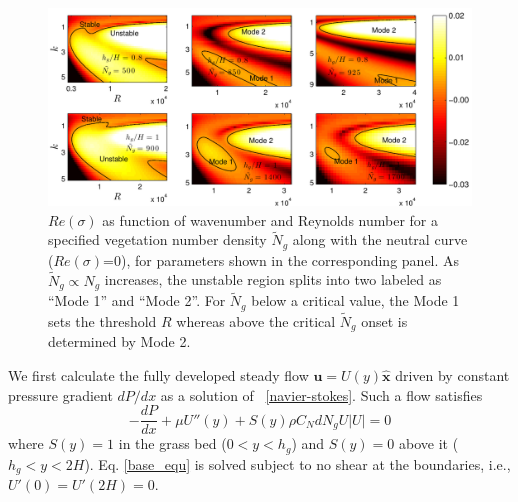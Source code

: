 \documentclass[aps,preprint,12pt]{revtex4-1}  %
\newcommand{\bu}{\mathbf{u}}
\newcommand{\hg}{h_g}
\newcommand{\Rey}{{R}}
\newcommand{\Ndg}{\tilde{N}_g}
\begin{document}
\begin{figure}
 \includegraphics[width=\textwidth]{SetAll_imgsc}

\caption{$Re(\sigma)$ as function of wavenumber and Reynolds number for a specified vegetation number density $\Ndg$ along with the neutral curve ($Re(\sigma)$=0), for parameters shown in the corresponding panel.  
As $\Ndg \propto N_g$ increases, the unstable region splits into two labeled as ``Mode 1'' and ``Mode 2''. 
For $\Ndg$ below a critical value, the Mode 1 sets the threshold $\Rey$ whereas above the critical $\Ndg$ onset is determined by Mode 2.}
\label{K_Re_sigma_set3}
\end{figure}
We first calculate the fully developed steady flow $\bu = U(y)\boldsymbol{\hat{x}}$ driven by constant pressure gradient $dP/dx$ as a solution of ~\eqref{navier-stokes}. 
Such a flow satisfies 
\begin{equation}
 -\frac{dP}{dx}+\mu U''(y) +S(y) \rho C_N d N_gU |U|=0
\label{base_equ}
\end{equation}
where $S(y)=1$ in the grass bed ($0<y<\hg$) and $S(y)=0$ above it ($\hg< y< 2H$). 
Eq. \eqref{base_equ} is solved subject to no shear at the boundaries, i.e., $U'(0) = U'(2H) = 0$.
\end{document}
